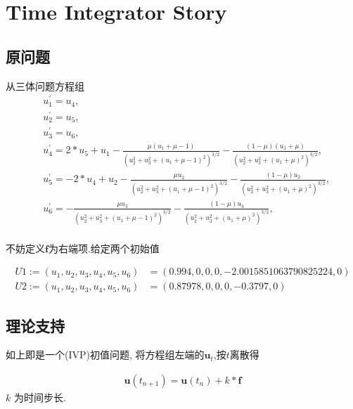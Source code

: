 \documentclass[a4paper]{book}
\numberwithin{equation}{chapter}
\theoremstyle{definition}
\begin{document}
\pagestyle{empty}




\setcounter{chapter}{0}

\chapter{Time Integrator Story}

\section{原问题}
从三体问题方程组
\begin{align*}
	&u_1^{'} = u_4, \\
	&u_2^{'} = u_5, \\
	&u_3^{'} = u_6, \\
	&u_4^{'} = 2 * u_5 + u_1 - \frac{\mu (u_1 + \mu - 1)}{(u_2^2 + u_3^2 + (u_1 + \mu - 1)^2)^{3/2}} - 
	\frac{(1 - \mu)(u_1 + \mu)}{(u_2^2 + u_3^2 + (u_1 + \mu)^2)^{3/2}}, \\
	&u_5^{'} = -2 * u_4 +u_2 - \frac{\mu u_2}{(u_2^2 + u_3^2 + (u_1 + \mu - 1)^2)^{3/2}} - 
	\frac{(1 - \mu)u_2}{(u_2^2 + u_3^2 + (u_1 + \mu)^2)^{3/2}}, \\
	&u_6^{'} = - \frac{\mu u_3}{(u_2^2 + u_3^2 + (u_1 + \mu - 1)^2)^{3/2}} - 
	\frac{(1 - \mu)u_3}{(u_2^2 + u_3^2 + (u_1 + \mu)^2)^{3/2}}, \\
\end{align*}

不妨定义$\mathbf{f}$为右端项.给定两个初始值

\begin{align*}
	U1 := (u_1, u_2, u_3, u_4, u_5, u_6) &= (0.994, 0, 0, 0, −2.0015851063790825224, 0) \\
	U2 := (u_1, u_2, u_3, u_4, u_5, u_6) &= (0.87978, 0, 0, 0, −0.3797, 0)
\end{align*}

\section{理论支持}
如上即是一个(IVP)初值问题, 将方程组左端的$\mathbf{u}_t$,按$t$离散得

\begin{align*}
	\mathbf{u}(t_{n+1}) = \mathbf{u}(t_{n}) + k * \mathbf{f}
\end{align*}
$k$ 为时间步长.
\end{document}
